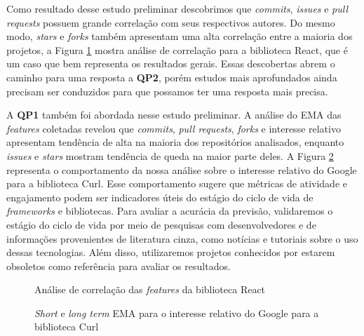 \documentclass[11pt,a4paper]{article}
\newcommand{\en}[1]{\textit{#1}}
\begin{document}
Como resultado desse estudo preliminar descobrimos que \en{commits}, \en{issues} e \en{pull requests} possuem grande correlação com seus respectivos autores. Do mesmo modo, \en{stars} e \en{forks} também apresentam uma alta correlação entre a maioria dos projetos, a Figura \ref{react} mostra análise de correlação para a biblioteca React, que é um caso que bem representa os resultados gerais. Essas descobertas abrem o caminho para uma resposta a \textbf{QP2}, porém estudos mais aprofundados ainda precisam ser conduzidos para que possamos ter uma resposta mais precisa.

A \textbf{QP1} também foi abordada nesse estudo preliminar. A análise do EMA das \en{features} coletadas revelou que \en{commits}, \en{pull requests}, \en{forks} e interesse relativo apresentam tendência de alta na maioria dos repositórios analisados, enquanto \en{issues} e \en{stars} mostram tendência de queda na maior parte deles. A Figura \ref{curl} representa o comportamento da nossa análise sobre o interesse relativo do Google para a biblioteca Curl. Esse comportamento sugere que métricas de atividade e engajamento podem ser indicadores úteis do estágio do ciclo de vida de \en{frameworks} e bibliotecas. Para avaliar a acurácia da previsão, validaremos o estágio do ciclo de vida por meio de pesquisas com desenvolvedores e de informações provenientes de literatura cinza, como notícias e tutoriais sobre o uso dessas tecnologias. Além disso, utilizaremos projetos conhecidos por estarem obsoletos como referência para avaliar os resultados.

\begin{figure}[htbp]
    \centering
    
    \caption{Análise de correlação das \en{features} da biblioteca React}
    \label{react}
\end{figure}

\begin{figure}[htbp]
    \centering
    
    \caption{\en{Short} e \en{long term} EMA para o interesse relativo do Google para a biblioteca Curl}
    \label{curl}
\end{figure}




\end{document}
